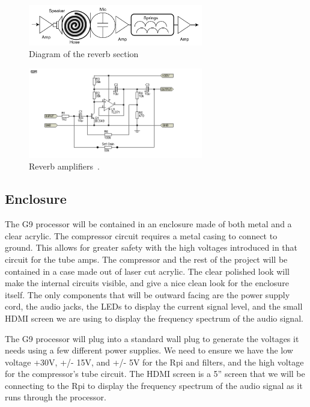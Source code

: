 \documentclass[journal]{IEEEtran}
\begin{document}
	\begin{figure}
		\centering
		\includegraphics[width=3in]{reverbBlock}
		\caption{Diagram of the reverb section }
		\label{fig:reverbBlock}
	\end{figure}
	
	
	
	\begin{figure}
		\centering
		\includegraphics[width=3in]{espMicPreSpringDrive}
		\caption{Reverb amplifiers~\cite{espMicPreSpringDrive}. }
		\label{fig:espMicPreSpringDrive}
	\end{figure}

	\subsection{Enclosure}
	The G9 processor will be contained in an enclosure made of both metal and a clear acrylic.  The compressor circuit requires a metal casing to connect to ground.  This allows for greater safety with the high voltages introduced in that circuit for the tube amps.  The compressor and the rest of the project will be contained in a case made out of laser cut acrylic.  The clear polished look will make the internal circuits visible, and give a nice clean look for the enclosure itself.  The only components that will be outward facing are the power supply cord, the audio jacks, the LEDs to display the current signal level, and the small HDMI screen we are using to display the frequency spectrum of the audio signal.  
	
	The G9 processor will plug into a standard wall plug to generate the voltages it needs using a few different power supplies.  We need to ensure we have the low voltage +30V, +/- 15V,  and +/- 5V for the Rpi and filters, and the high voltage for the compressor's tube circuit.  The HDMI screen is a 5'' screen that we will be connecting to the Rpi to display the frequency spectrum of the audio signal as it runs through the processor.  
	
\end{document}
